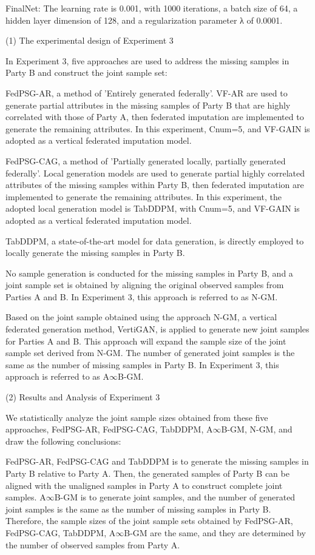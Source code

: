 \documentclass[final,1p,times]{elsarticle}
\begin{document}
FinalNet: The learning rate is 0.001, with 1000 iterations, a batch size of 64, a hidden layer dimension of 128, and a regularization parameter λ of 0.0001.

(1) The experimental design of Experiment 3

In Experiment 3, five approaches are used to address the missing samples in Party B and construct the joint sample set:  

 FedPSG-AR, a method of 'Entirely generated federally'. VF-AR are used to generate partial attributes in the missing samples of Party B that are highly correlated with those of Party A, then federated imputation are implemented to generate the remaining attributes. In this experiment, Cnum=5, and VF-GAIN is adopted as a vertical federated imputation model. 

 FedPSG-CAG, a method of 'Partially generated locally, partially generated federally'. Local generation models are used to generate partial highly correlated attributes of the missing samples within Party B, then federated imputation are implemented to generate the remaining attributes. In this experiment, the adopted local generation model is TabDDPM, with Cnum=5, and VF-GAIN is adopted as a vertical federated imputation model. 

 TabDDPM, a state-of-the-art model for data generation, is directly employed to locally generate the missing samples in Party B.

 No sample generation is conducted for the missing samples in Party B, and a joint sample set is obtained by aligning the original observed samples from Parties A and B. In Experiment 3, this approach is referred to as N-GM. 

 Based on the joint sample obtained using the approach N-GM, a vertical federated generation method, VertiGAN\cite{3}, is applied to generate new joint samples for Parties A and B. This approach will expand the sample size of the joint sample set derived from N-GM. The number of generated joint samples is the same as the number of missing samples in Party B. In Experiment 3, this approach is referred to as A$\infty$B-GM.

(2) Results and Analysis of Experiment 3

We statistically analyze the joint sample sizes obtained from these five approaches, FedPSG-AR, FedPSG-CAG, TabDDPM, A$\infty$B-GM, N-GM, and draw the following conclusions:

 FedPSG-AR, FedPSG-CAG and TabDDPM is to generate the missing samples in Party B relative to Party A. Then, the generated samples of Party B can be aligned with the unaligned samples in Party A to construct complete joint samples. A$\infty$B-GM is to generate joint samples, and the number of generated joint samples is the same as the number of missing samples in Party B. Therefore, the sample sizes of the joint sample sets obtained by FedPSG-AR, FedPSG-CAG, TabDDPM, A$\infty$B-GM are the same, and they are determined by the number of observed samples from Party A.
\end{document}
